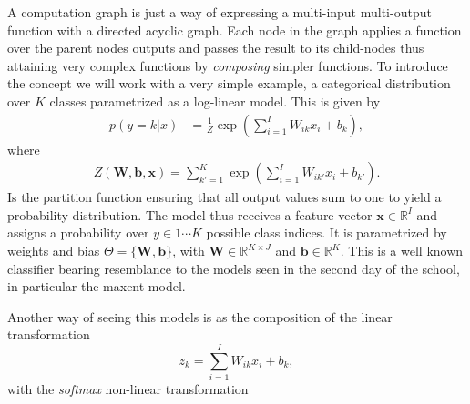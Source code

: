 A computation graph is just a way of expressing a multi-input multi-output
function with a directed acyclic graph. Each node in the graph applies a
function over the parent nodes outputs and passes the result to its child-nodes
thus attaining very complex functions by \textit{composing} simpler functions.
To introduce the concept we will work with a very simple example, a categorical
distribution over $K$ classes parametrized as a log-linear model. This is given
by
%
\begin{align}
p(y=k|{x}) & = \frac{1}{Z}\exp\left(\sum_{i=1}^{I} W_{ik} x_i + b_k\right),
\label{eq:loglineargen}
\end{align}
%
\noindent where 
\begin{align}
Z(\mathbf{W},\mathbf{b},\mathbf{x}) = \sum_{k'=1}^{K} \exp\left(\sum_{i=1}^{I} W_{ik'} x_i + b_{k'}\right). 
\label{eq:loglineargenPartition}
\end{align}
%
Is the partition function ensuring that all output values sum to one to yield
a probability distribution. The model thus receives a feature vector
$\mathbf{x} \in \mathbb{R}^{I}$ and assigns a probability over $y \in {1 \cdots K}$ possible
class indices. It is parametrized by weights and bias $\Theta=\{\mathbf{W},
\mathbf{b}\}$, with $\mathbf{W} \in \mathbb{R}^{K \times J}$ and $\mathbf{b}
\in \mathbb{R}^{K}$. This is a well known classifier bearing resemblance to the
models seen in the second day of the school, in
particular the maxent model\footnotemark{}. 

Another way of seeing this models is as the composition of the linear transformation 
%
\begin{equation}
    z_k = \sum_{i=1}^{I} W_{ik} x_i + b_k,
\label{eq:linear}
\end{equation}
%
with the \textit{softmax} non-linear transformation

